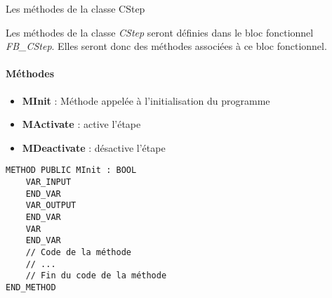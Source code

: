 \begin{UPSTIidee}{Les méthodes de la classe CStep}
        \begin{minipage}[t]{.6\linewidth}
            Les méthodes de la classe \emph{CStep} seront définies dans le bloc fonctionnel \emph{FB\_CStep}. Elles seront donc des méthodes associées à ce bloc fonctionnel.
        \paragraph{Méthodes}
        \begin{itemize}
            \item \textbf{MInit} : Méthode appelée à l'initialisation du programme
            \item \textbf{MActivate} : active l'étape
            \item \textbf{MDeactivate} : désactive l'étape
        \end{itemize}
    \end{minipage}%
    \begin{minipage}[t]{.35\linewidth}
        \begin{lstlisting}
METHOD PUBLIC MInit : BOOL
    VAR_INPUT
    END_VAR
    VAR_OUTPUT
    END_VAR
    VAR
    END_VAR
    // Code de la méthode
    // ...
    // Fin du code de la méthode
END_METHOD
        \end{lstlisting}
    \end{minipage}
\end{UPSTIidee}